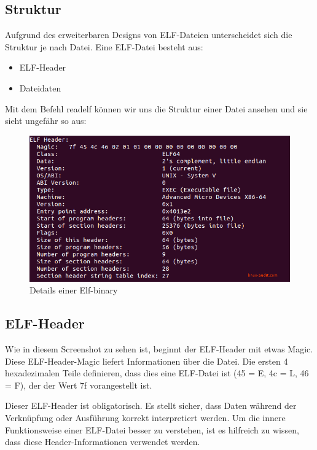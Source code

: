 \subsection{Struktur}
Aufgrund des erweiterbaren Designs von ELF-Dateien unterscheidet sich die Struktur je nach Datei. Eine ELF-Datei besteht aus:

\begin{itemize} 
\item ELF-Header
\item Dateidaten
\end{itemize}

Mit dem Befehl readelf können wir uns die Struktur einer Datei ansehen und sie sieht ungefähr so aus:

\begin{figure}[H]
    \begin{center}
        \includegraphics[scale=0.5]{images/elf-header-linux-binary.png}
        \caption{Details einer Elf-binary \cite{details_of_Elf_binary}}
    \end{center}
\end{figure}
 
\subsection{ELF-Header}
Wie in diesem Screenshot zu sehen ist, beginnt der ELF-Header mit etwas Magic. Diese ELF-Header-Magic liefert Informationen über die Datei. Die ersten 4 hexadezimalen Teile definieren, dass dies eine ELF-Datei ist (45 = E, 4c = L, 46 = F), der der Wert 7f vorangestellt ist.
 
Dieser ELF-Header ist obligatorisch. Es stellt sicher, dass Daten während der Verknüpfung oder Ausführung korrekt interpretiert werden. Um die innere Funktionsweise einer ELF-Datei besser zu verstehen, ist es hilfreich zu wissen, dass diese Header-Informationen verwendet werden.
 
